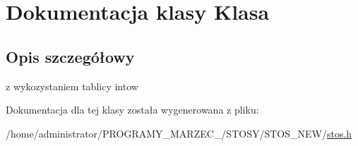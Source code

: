 \hypertarget{class_klasa}{\section{Dokumentacja klasy Klasa}
\label{class_klasa}
}


\subsection{Opis szczegółowy}
z wykozystaniem tablicy intow 

Dokumentacja dla tej klasy została wygenerowana z pliku\+:\begin{DoxyCompactItemize}
\item 
/home/administrator/\+P\+R\+O\+G\+R\+A\+M\+Y\+\_\+\+M\+A\+R\+Z\+E\+C\+\_/\+S\+T\+O\+S\+Y/\+S\+T\+O\+S\+\_\+\+N\+E\+W/\hyperlink{stos_8h}{stos.\+h}\end{DoxyCompactItemize}
